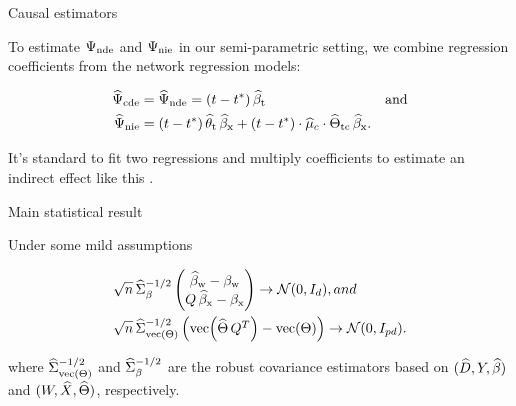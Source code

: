 \documentclass{beamer}
\theoremstyle{remark}
\begin{document}
\begin{frame}{Causal estimators}

    To estimate $\Psi_\text{nde}$ and $\Psi_\text{nie}$ in our semi-parametric setting, we combine regression coefficients from the network regression models:

    \begin{align*}
        \cdehat & = \ndehat = \paren*{t - t^*} \, \betathat                                                                              & \text{and} \\
        \niehat & = \paren*{t - t^*} \, \thetathat \, \betaxhat + \paren*{t - t^*} \cdot \widehat{\mu}_c \cdot \Thetatchat \, \betaxhat.
    \end{align*}

    It's standard to fit two regressions and multiply coefficients to estimate an indirect effect like this \citep{vanderweele_mediation_2014}.

\end{frame}


\begin{frame}{Main statistical result}

    \begin{theorem}

        \vspace{2mm}

        Under some mild assumptions

        \begin{equation*}
            \begin{aligned}
                \sqrt{ n } \,
                 & \Sigmahatbeta^{-1/2}
                \begin{pmatrix}
                    \betawhat - \betaw \\
                    Q \, \betaxhat - \betax
                \end{pmatrix}
                \to
                \Normal{0}{I_d}, and     \\
                \sqrt{ n } \,
                 & \Sigmahattheta^{-1/2}
                \begin{pmatrix}
                    \vecc \paren*{\Thetahat \, Q^T} - \Thetavec
                \end{pmatrix}
                \to
                \Normal{0}{I_{p d}}.
            \end{aligned}
        \end{equation*}

        \noindent where $\widehat{\Sigma}_{\operatorname*{vec} \left(\Theta\right)}^{-1/2}$ and $\widehat{\Sigma}_\beta^{-1/2}$ are the robust covariance estimators based on $(\widehat{D}, Y, \widehat{\beta})$ and $(W, \widehat{X}, \widehat \Theta)$, respectively.
    \end{theorem}
\end{frame}
\end{document}
